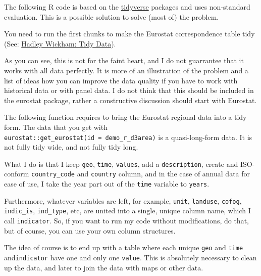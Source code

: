 \documentclass[]{article}
\begin{document}
The following R code is based on the
\href{https://www.tidyverse.org/}{tidyverse} packages and uses
non-standard evaluation. This is a possible solution to solve (most of)
the problem.

You need to run the first chunks to make the Eurostat correspondence
table tidy (See:
\href{https://vita.had.co.nz/papers/tidy-data.pdf}{Hadley Wickham: Tidy
Data}).

As you can see, this is not for the faint heart, and I do not guarrantee
that it works with all data perfectly. It is more of an illustration of
the problem and a list of ideas how you can improve the data quality if
you have to work with historical data or with panel data. I do not think
that this should be included in the eurostat package, rather a
constructive discussion should start with Eurostat.

The following function requires to bring the Eurostat regional data into
a tidy form. The data that you get with
\texttt{eurostat::get\_eurostat(id\ =\ \textquotesingle{}demo\_r\_d3area\textquotesingle{})}
is a quasi-long-form data. It is not fully tidy wide, and not fully tidy
long.

What I do is that I keep \texttt{geo}, \texttt{time}, \texttt{values},
add a \texttt{description}, create and ISO-conform
\texttt{country\_code} and \texttt{country} column, and in the case of
annual data for ease of use, I take the year part out of the
\texttt{time} variable to \texttt{years}.

Furthermore, whatever variables are left, for example, \texttt{unit},
\texttt{landuse}, \texttt{cofog}, \texttt{indic\_is},
\texttt{ind\_type}, etc, are united into a single, unique column name,
which I call \texttt{indicator}. So, if you want to run my code without
modifications, do that, but of course, you can use your own column
structures.

The idea of course is to end up with a table where each unique
\texttt{geo} and \texttt{time} and\texttt{indicator} have one and only
one \texttt{value}. This is absolutely necessary to clean up the data,
and later to join the data with maps or other data.
\end{document}
